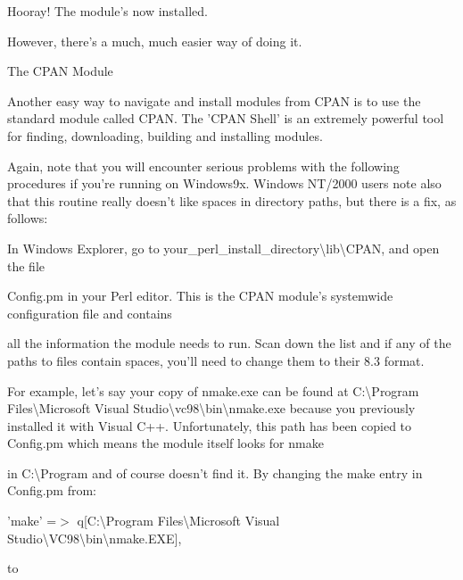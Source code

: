 \documentclass[a4paper,11pt]{book}
\begin{document}
\noindent 

\noindent 

\noindent Hooray! The module's now installed.

\noindent However, there's a much, much easier way of doing it.

\noindent 

\noindent The CPAN Module

\noindent 

\noindent Another easy way to navigate and install modules from CPAN is to use the standard module called CPAN. The 'CPAN Shell' is an extremely powerful tool for finding, downloading, building and installing modules.

\noindent 

\noindent Again, note that you will encounter serious problems with the following procedures if you're running on Windows9x. Windows NT/2000 users note also that this routine really doesn't like spaces in directory paths, but there is a fix, as follows:

\noindent 

\noindent In Windows Explorer, go to your\_perl\_install\_directory\textbackslash lib\textbackslash CPAN, and open the file

\noindent Config.pm in your Perl editor. This is the CPAN module's systemwide configuration file and contains

\noindent all the information the module needs to run. Scan down the list and if any of the paths to files contain spaces, you'll need to change them to their 8.3 format.

\noindent 

\noindent For example, let's say your copy of nmake.exe can be found at C:\textbackslash Program Files\textbackslash Microsoft Visual Studio\textbackslash vc98\textbackslash bin\textbackslash nmake.exe because you previously installed it with Visual C++. Unfortunately, this path has been copied to Config.pm which means the module itself looks for nmake

\noindent in C:\textbackslash Program and of course doesn't find it. By changing the make entry in Config.pm from:

\noindent 

\noindent 'make' =$>$ q[C:\textbackslash Program Files\textbackslash Microsoft Visual Studio\textbackslash VC98\textbackslash bin\textbackslash nmake.EXE],

\noindent 

\noindent to
\end{document}
